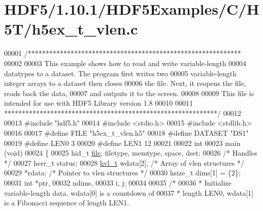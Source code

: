 \hypertarget{_h_d_f5_21_810_81_2_h_d_f5_examples_2_c_2_h5_t_2h5ex__t__vlen_8c_source}{}\section{H\+D\+F5/1.10.1/\+H\+D\+F5\+Examples/\+C/\+H5\+T/h5ex\+\_\+t\+\_\+vlen.c}
\label{_h_d_f5_21_810_81_2_h_d_f5_examples_2_c_2_h5_t_2h5ex__t__vlen_8c_source}

\begin{DoxyCode}
00001 \textcolor{comment}{/************************************************************}
00002 \textcolor{comment}{}
00003 \textcolor{comment}{  This example shows how to read and write variable-length}
00004 \textcolor{comment}{  datatypes to a dataset.  The program first writes two}
00005 \textcolor{comment}{  variable-length integer arrays to a dataset then closes}
00006 \textcolor{comment}{  the file.  Next, it reopens the file, reads back the data,}
00007 \textcolor{comment}{  and outputs it to the screen.}
00008 \textcolor{comment}{}
00009 \textcolor{comment}{  This file is intended for use with HDF5 Library version 1.8}
00010 \textcolor{comment}{}
00011 \textcolor{comment}{ ************************************************************/}
00012 
00013 \textcolor{preprocessor}{#include "hdf5.h"}
00014 \textcolor{preprocessor}{#include <stdio.h>}
00015 \textcolor{preprocessor}{#include <stdlib.h>}
00016 
00017 \textcolor{preprocessor}{#define FILE            "h5ex\_t\_vlen.h5"}
00018 \textcolor{preprocessor}{#define DATASET         "DS1"}
00019 \textcolor{preprocessor}{#define LEN0            3}
00020 \textcolor{preprocessor}{#define LEN1            12}
00021 
00022 \textcolor{keywordtype}{int}
00023 main (\textcolor{keywordtype}{void})
00024 \{
00025     hid\_t       \hyperlink{structfile}{file}, filetype, memtype, space, dset;
00026                                     \textcolor{comment}{/* Handles */}
00027     herr\_t      status;
00028     \hyperlink{structhvl__t}{hvl\_t}       wdata[2],           \textcolor{comment}{/* Array of vlen structures */}
00029                 *rdata;             \textcolor{comment}{/* Pointer to vlen structures */}
00030     hsize\_t     dims[1] = \{2\};
00031     \textcolor{keywordtype}{int}         *ptr,
00032                 ndims,
00033                 i, j;
00034 
00035     \textcolor{comment}{/*}
00036 \textcolor{comment}{     * Initialize variable-length data.  wdata[0] is a countdown of}
00037 \textcolor{comment}{     * length LEN0, wdata[1] is a Fibonacci sequence of length LEN1.}

\end{DoxyCode}
